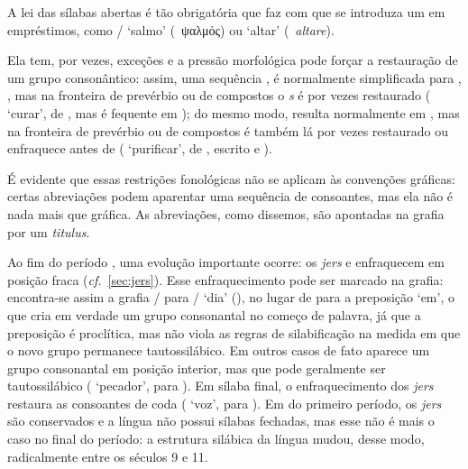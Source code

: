 A lei das sílabas abertas é tão obrigatória que faz com que se introduza um
 em empréstimos, como \slash{}
`salmo' (~ψαλμός) ou
 `altar'
(~\emph{altare}).

Ela tem, por vezes, exceções e a pressão morfológica pode forçar a restauração
de um grupo consonântico: assim, uma sequência ,  é
normalmente simplificada para , , mas na fronteira de
prevérbio ou de compostos o \emph{s} é por vezes restaurado
( `curar', de , mas
 é fequente em ); do mesmo modo,
 resulta normalmente em , mas na fronteira de prevérbio ou de
compostos é também lá por vezes restaurado ou enfraquece antes de 
( `purificar', de
, escrito  e ).

É evidente que essas restrições fonológicas não se aplicam às convenções
gráficas: certas abreviações podem aparentar uma sequência de consoantes, mas
ela não é nada mais que gráfica. As abreviações, como dissemos, são apontadas na
grafia por um \emph{titulus}.

Ao fim do período , uma evolução importante ocorre: os \emph{jers}
 e  enfraquecem em posição fraca (\emph{cf.}~\ref{sec:jers}).
Esse enfraquecimento pode ser marcado na grafia: encontra-se assim a grafia
\slash{} para \slash{} `dia'
(),  no lugar de
 para a preposição `em', o que cria em verdade um
grupo consonantal no começo de palavra, já que a preposição é proclítica, mas
não viola as regras de silabificação na medida em que o novo grupo permanece
tautossilábico.
Em outros casos de fato aparece um grupo consonantal em posição interior, mas
que pode geralmente ser tautossilábico
( `pecador', para
).
Em sílaba final, o enfraquecimento dos \emph{jers} restaura as consoantes
de coda ( `voz', para
).
Em  do primeiro período, os \emph{jers} são conservados e a língua
não possui sílabas fechadas, mas esse não é mais o caso no final do período: a
estrutura silábica da língua mudou, desse modo, radicalmente entre os séculos 9
e 11\@.

